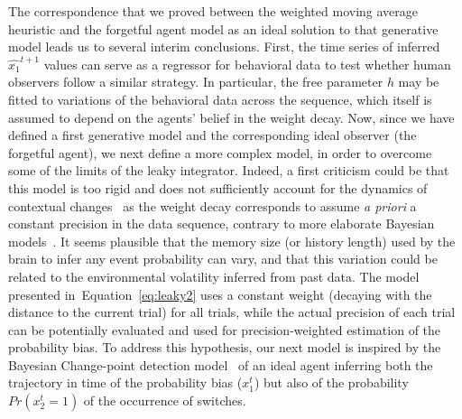 \documentclass[12pt,english]{article}%
\newcommand{\citep}[1]{\parencite{#1}}
\newcommand{\seeFig}[1]{Figure~\ref{fig:#1}}
\newcommand{\seeEq}[1]{Equation~\ref{eq:#1}}
\begin{document}
The correspondence that we proved between the weighted moving average heuristic
and the forgetful agent model as an ideal solution to that generative model leads
us to several interim conclusions.
First, the time series of inferred $\hat{x_1}^{t+1}$ values
can serve as a regressor for behavioral data
to test whether human observers follow a similar strategy.
In particular, the free parameter $h$
may be fitted to variations of the behavioral data across the sequence,
which itself is assumed to depend on the agents' belief in the weight decay.
Now, since we have defined a first generative model
and the corresponding ideal observer (the forgetful agent),
we next define a more complex model,
in order to overcome some of the limits of the leaky integrator.
Indeed, a first criticism could be that
this model is too rigid and does not sufficiently
account for the dynamics of contextual changes~\citep{Behrens07}
as the weight decay corresponds to assume \emph{a priori} a constant precision in the data sequence, contrary to more elaborate Bayesian models~\citep{Vilares2011}.
It seems plausible that the memory size (or history length) used by the brain
to infer any event probability can vary, and that this variation could be related
to the environmental volatility inferred from past data.
The model presented in~\seeEq{leaky2} uses a constant weight
(decaying with the distance to the current trial)
for all trials, while the actual precision of each trial
can be potentially evaluated and used
for precision-weighted estimation of the probability bias.
To address this hypothesis, our next model is inspired
by the Bayesian Change-point detection model~\citep{AdamsMackay2007}
of an ideal agent inferring
both the trajectory in time of the probability bias ($x_1^t$)
but also of the probability $Pr(x_2^t=1)$ of the occurrence of switches.
\end{document}
